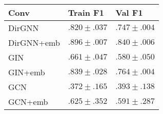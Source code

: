 \begin{tabular}{lll}
\toprule
Conv & Train \textbf{F1} & Val \textbf{F1} \\
\midrule
DirGNN & $.820\scriptstyle \pm .037$ & $.747\scriptstyle \pm .004$ \\
DirGNN+emb & $\mathbf{.896\scriptstyle \pm .007}$ & $\mathbf{.840\scriptstyle \pm .006}$ \\
GIN & $.661\scriptstyle \pm .047$ & $.580\scriptstyle \pm .050$ \\
GIN+emb & $.839\scriptstyle \pm .028$ & $.764\scriptstyle \pm .004$ \\
GCN & $.372\scriptstyle \pm .165$ & $.393\scriptstyle \pm .138$ \\
GCN+emb & $.625\scriptstyle \pm .352$ & $.591\scriptstyle \pm .287$ \\
\bottomrule
\end{tabular}
